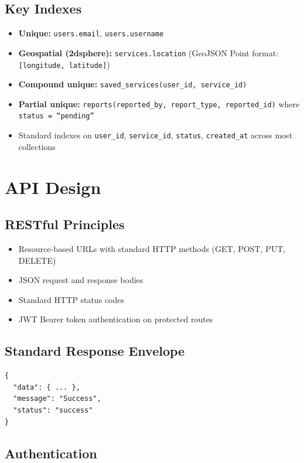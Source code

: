 \documentclass[10pt,a4paper]{report}
\begin{document}
\subsection{Key Indexes}

\begin{itemize}
    \item \textbf{Unique:} \texttt{users.email}, \texttt{users.username}
    \item \textbf{Geospatial (2dsphere):} \texttt{services.location} (GeoJSON Point format: \texttt{[longitude, latitude]})
    \item \textbf{Compound unique:} \texttt{saved\_services(user\_id, service\_id)}
    \item \textbf{Partial unique:} \texttt{reports(reported\_by, report\_type, reported\_id)} where \texttt{status = ``pending''}
    \item Standard indexes on \texttt{user\_id}, \texttt{service\_id}, \texttt{status}, \texttt{created\_at} across most collections
\end{itemize}

\section{API Design}

\subsection{RESTful Principles}

\begin{itemize}
    \item Resource-based URLs with standard HTTP methods (GET, POST, PUT, DELETE)
    \item JSON request and response bodies
    \item Standard HTTP status codes
    \item JWT Bearer token authentication on protected routes
\end{itemize}

\subsection{Standard Response Envelope}

\begin{lstlisting}
{
  "data": { ... },
  "message": "Success",
  "status": "success"
}
\end{lstlisting}

\subsection{Authentication}
\end{document}
